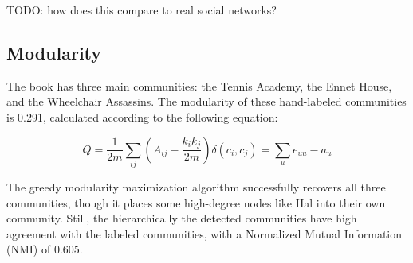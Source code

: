 TODO: how does this compare to real social networks?

\subsection{Modularity}
The book has three main communities: the Tennis Academy, the Ennet House, and the Wheelchair Assassins. The modularity of these hand-labeled communities is 0.291, calculated according to the following equation:

$$Q = \frac{1}{2m}\sum_{ij} \left(A_{ij} - \frac{k_ik_j}{2m} \right) \delta(c_i,c_j) = \sum_u e_{uu} - a_u $$

The greedy modularity maximization algorithm successfully recovers all three communities, though it places some high-degree nodes like Hal into their own community. Still, the hierarchically the detected communities have high agreement with the labeled communities, with a Normalized Mutual Information (NMI) of 0.605.

